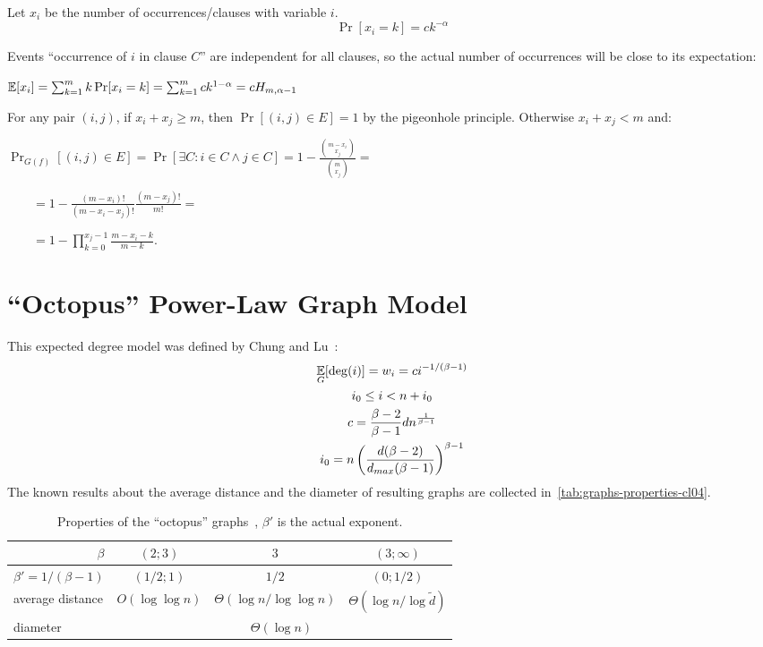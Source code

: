 Let $x_i$ be the number of occurrences/clauses with variable $i$.
\begin{equation}
    \Pr[x_i=k]=ck^{-\alpha}
\end{equation}

Events ``occurrence of $i$ in clause $C$'' are independent for all clauses,
so the actual number of occurrences will be close to its expectation:

$\mathop{{}\mathbb{E}}[x_i]=\sum_{k=1}^m{k\Pr[x_i=k]}=\sum_{k=1}^m{ck^{1-\alpha}}=cH_{m,\alpha-1}$

For any pair $(i,j)$, if $x_i+x_j\geq m$, then $\Pr[(i,j)\in E]=1$ by the pigeonhole principle.
Otherwise $x_i+x_j<m$ and:

$\Pr_{G(f)}[(i,j)\in E]=\Pr[\exists C:i\in C\land j\in C]
=1-\frac{\binom{m-x_i}{x_j}}{\binom{m}{x_j}}=$

$\qquad=1-\frac{(m-x_i)!}{(m-x_i-x_j)!}\frac{(m-x_j)!}{m!}=$

$\qquad=1-\prod_{k=0}^{x_j-1}{\frac{m-x_i-k}{m-k}}$.

\section{\texorpdfstring{``Octopus''}{"Octopus"} Power-Law Graph Model}
\label{sec:powerlaw-octopus-model}

This expected degree model was defined by Chung and Lu~\cite{cl04}:
\begin{gather}
    \mathop{{}\mathbb{E}}_G[\deg(i)]=w_i=ci^{-1/(\beta-1)}\\
    i_0\leq i<n+i_0\\
    c=\frac{\beta-2}{\beta-1}dn^{\frac{1}{\beta-1}}\\
    i_0=n\left(\frac{d(\beta-2)}{d_{max}(\beta-1)}\right)^{\beta-1}
\end{gather}
The known results about the average distance and the diameter of resulting graphs
are collected in~\autoref{tab:graphs-properties-cl04}.

\begin{table}
    \begin{center}
        \renewcommand*{\arraystretch}{1.3}
        \begin{tabular}{|l|c|c|c|}
            \hline
            \multicolumn{1}{|r|}{$\beta$} & $(2;3)$ & $3$ & $(3;\infty)$\\
            \hline
            \multicolumn{1}{|r|}{$\beta'=1/(\beta-1)$} & $(1/2;1)$ & $1/2$ & $(0;1/2)$\\
            \hline\hline
            average distance & $O(\log\log n)$ & $\Theta(\log n/\log\log n)$ & $\Theta(\log n/\log \tilde{d})$\\
            \hline
            diameter & \multicolumn{3}{|c|}{$\Theta(\log n)$}\\
            \hline
        \end{tabular}
        \caption[Properties of the ``octopus'' graphs~\cite{cl04}.]
                {Properties of the ``octopus'' graphs~\cite{cl04}, $\beta'$ is the actual exponent.}
        \label{tab:graphs-properties-cl04}
    \end{center}
\end{table}

